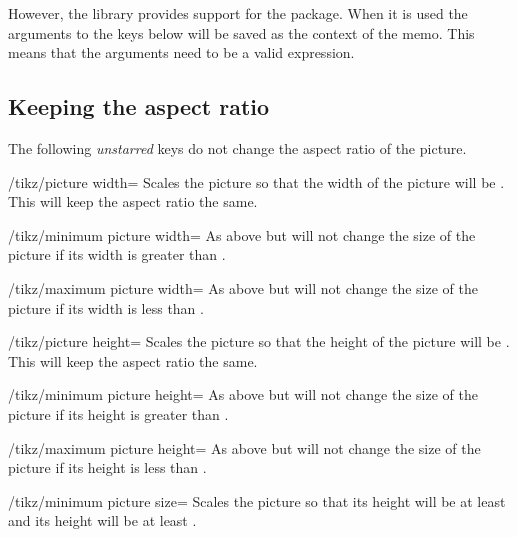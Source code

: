 \begin{multicols}{2}
However, the library provides support for the
 \cite{memoize} package.
When it is used the arguments to the keys below
will be saved as the context of the memo.
This means that the arguments need to be a valid
 expression.

\subsection{Keeping the aspect ratio}
The following \emph{unstarred} keys do not change the aspect ratio of the picture.

\begin{key}{/tikz/picture width=}
  Scales the picture so that the width of the picture will be .
  This will keep the aspect ratio the same.
\end{key}

\begin{key}{/tikz/minimum picture width=}
  As above but will not change the size of the picture
  if its width is greater than .
\end{key}

\begin{key}{/tikz/maximum picture width=}
  As above but will not change the size of the picture
  if its width is less than .
\end{key}

\begin{key}{/tikz/picture height=}
  Scales the picture so that the height of the picture will be .
  This will keep the aspect ratio the same.
\end{key}

\begin{key}{/tikz/minimum picture height=}
  As above but will not change the size of the picture
  if its height is greater than .
\end{key}

\begin{key}{/tikz/maximum picture height=}
  As above but will not change the size of the picture
  if its height is less than .
\end{key}

\begin{key}{/tikz/minimum picture size=}
  Scales the picture so that its height will be at least 
  and its height will be at least .
\end{key}


\end{multicols}
